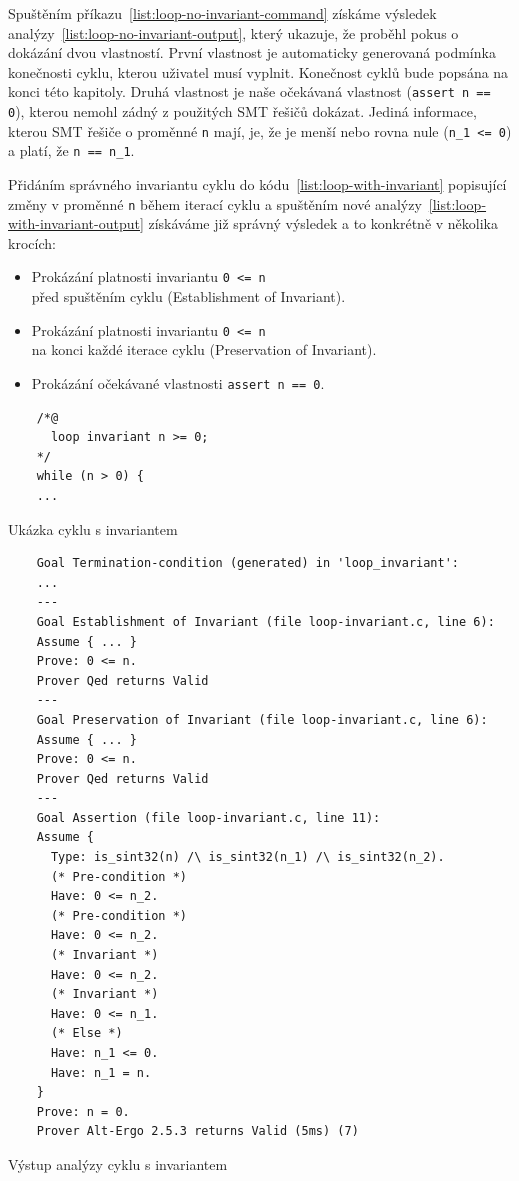 Spuštěním příkazu~\ref{list:loop-no-invariant-command} získáme výsledek analýzy~\ref{list:loop-no-invariant-output},
který ukazuje, že proběhl pokus o dokázání dvou vlastností.
První vlastnost je automaticky generovaná podmínka konečnosti cyklu, kterou uživatel musí vyplnit.
Konečnost cyklů bude popsána na konci této kapitoly.
Druhá vlastnost je naše očekávaná vlastnost (\texttt{assert n == 0}),
kterou nemohl zádný z použitých SMT řešičů dokázat.
Jediná informace, kterou SMT řešiče o proměnné \texttt{n} mají,
je, že je menší nebo rovna nule (\texttt{n\_1 <= 0}) a platí, že \texttt{n == n\_1}.


Přidáním správného invariantu cyklu do kódu~\ref{list:loop-with-invariant}
popisující změny v proměnné \texttt{n} během iterací cyklu
a spuštěním nové analýzy~\ref{list:loop-with-invariant-output}
získáváme již správný výsledek a to konkrétně v několika krocích:

\begin{itemize}
    \item Prokázání platnosti invariantu \texttt{0 <= n} \\
    před spuštěním cyklu (Establishment of Invariant).
    \item Prokázání platnosti invariantu \texttt{0 <= n} \\
    na konci každé iterace cyklu (Preservation of Invariant).
    \item Prokázání očekávané vlastnosti \texttt{assert n == 0}.
\end{itemize}

\begin{listing}[H]
    \begin{verbatim}
    /*@
      loop invariant n >= 0;
    */
    while (n > 0) {
    ...
    \end{verbatim}
    \caption{Ukázka cyklu s invariantem}
    \label{list:loop-with-invariant}
\end{listing}

\begin{listing}[H]
    \begin{verbatim}
    Goal Termination-condition (generated) in 'loop_invariant':
    ...
    ---
    Goal Establishment of Invariant (file loop-invariant.c, line 6):
    Assume { ... }
    Prove: 0 <= n.
    Prover Qed returns Valid
    ---
    Goal Preservation of Invariant (file loop-invariant.c, line 6):
    Assume { ... }
    Prove: 0 <= n.
    Prover Qed returns Valid
    ---
    Goal Assertion (file loop-invariant.c, line 11):
    Assume {
      Type: is_sint32(n) /\ is_sint32(n_1) /\ is_sint32(n_2).
      (* Pre-condition *)
      Have: 0 <= n_2.
      (* Pre-condition *)
      Have: 0 <= n_2.
      (* Invariant *)
      Have: 0 <= n_2.
      (* Invariant *)
      Have: 0 <= n_1.
      (* Else *)
      Have: n_1 <= 0.
      Have: n_1 = n.
    }
    Prove: n = 0.
    Prover Alt-Ergo 2.5.3 returns Valid (5ms) (7)
    \end{verbatim}
    \caption{Výstup analýzy cyklu s invariantem}
    \label{list:loop-with-invariant-output}
\end{listing}

